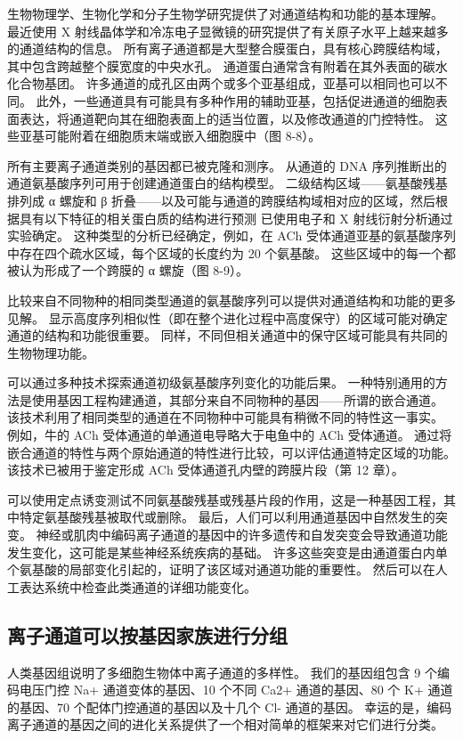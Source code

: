 生物物理学、生物化学和分子生物学研究提供了对通道结构和功能的基本理解。 
最近使用 X 射线晶体学和冷冻电子显微镜的研究提供了有关原子水平上越来越多的通道结构的信息。 
所有离子通道都是大型整合膜蛋白，具有核心跨膜结构域，其中包含跨越整个膜宽度的中央水孔。 
通道蛋白通常含有附着在其外表面的碳水化合物基团。 许多通道的成孔区由两个或多个亚基组成，亚基可以相同也可以不同。 
此外，一些通道具有可能具有多种作用的辅助亚基，包括促进通道的细胞表面表达，将通道靶向其在细胞表面上的适当位置，以及修改通道的门控特性。 
这些亚基可能附着在细胞质末端或嵌入细胞膜中（图 8-8）。


所有主要离子通道类别的基因都已被克隆和测序。 
从通道的 DNA 序列推断出的通道氨基酸序列可用于创建通道蛋白的结构模型。 
二级结构区域——氨基酸残基排列成 α 螺旋和 β 折叠——以及可能与通道的跨膜结构域相对应的区域，然后根据具有以下特征的相关蛋白质的结构进行预测 已使用电子和 X 射线衍射分析通过实验确定。 
这种类型的分析已经确定，例如，在 ACh 受体通道亚基的氨基酸序列中存在四个疏水区域，每个区域的长度约为 20 个氨基酸。 
这些区域中的每一个都被认为形成了一个跨膜的 α 螺旋（图 8-9）。


比较来自不同物种的相同类型通道的氨基酸序列可以提供对通道结构和功能的更多见解。 
显示高度序列相似性（即在整个进化过程中高度保守）的区域可能对确定通道的结构和功能很重要。 
同样，不同但相关通道中的保守区域可能具有共同的生物物理功能。


可以通过多种技术探索通道初级氨基酸序列变化的功能后果。 
一种特别通用的方法是使用基因工程构建通道，其部分来自不同物种的基因——所谓的嵌合通道。 
该技术利用了相同类型的通道在不同物种中可能具有稍微不同的特性这一事实。 
例如，牛的 ACh 受体通道的单通道电导略大于电鱼中的 ACh 受体通道。 
通过将嵌合通道的特性与两个原始通道的特性进行比较，可以评估通道特定区域的功能。 
该技术已被用于鉴定形成 ACh 受体通道孔内壁的跨膜片段（第 12 章）。


可以使用定点诱变测试不同氨基酸残基或残基片段的作用，这是一种基因工程，其中特定氨基酸残基被取代或删除。 
最后，人们可以利用通道基因中自然发生的突变。 
神经或肌肉中编码离子通道的基因中的许多遗传和自发突变会导致通道功能发生变化，这可能是某些神经系统疾病的基础。 
许多这些突变是由通道蛋白内单个氨基酸的局部变化引起的，证明了该区域对通道功能的重要性。 
然后可以在人工表达系统中检查此类通道的详细功能变化。



\subsection{离子通道可以按基因家族进行分组}
人类基因组说明了多细胞生物体中离子通道的多样性。 我们的基因组包含 9 个编码电压门控 Na+ 通道变体的基因、10 个不同 Ca2+ 通道的基因、80 个 K+ 通道的基因、70 个配体门控通道的基因以及十几个 Cl- 通道的基因。 
幸运的是，编码离子通道的基因之间的进化关系提供了一个相对简单的框架来对它们进行分类。


